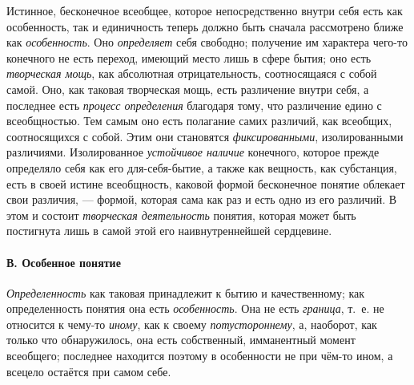 \documentclass[twoside]{article}
\begin{document}
{{Истинное, бесконечное всеобщее, которое непосредственно внутри
себя есть как особенность, так и единичность теперь должно быть сначала
рассмотрено ближе как
{\em особенность}. Оно
{\em определяет} себя
свободно; получение им характера чего-то конечного не есть переход, имеющий
место лишь в сфере бытия; оно есть
{\em творческая мощь},
как абсолютная отрицательность, соотносящаяся с собой самой.
Оно, как таковая творческая мощь, есть различение внутри себя, а последнее
есть {\em процесс определения}
благодаря тому, что различение едино с всеобщностью. Тем
самым оно есть полагание самих различий, как всеобщих, соотносящихся с
собой. Этим они становятся
{\em фиксированными},
изолированными различиями. Изолированное
{\em устойчивое наличие}
конечного, которое прежде определяло себя как его
для-себя-бытие, а также как вещность, как субстанция, есть в своей истине
всеобщность, каковой формой бесконечное понятие облекает свои различия, —
формой, которая сама как раз и есть одно из его различий. В
этом и состоит {\em творческая
деятельность} понятия, которая может быть постигнута лишь в
самой этой его наивнутреннейшей сердцевине.

\paragraph[В. Особенное понятие]{В. Особенное понятие}
{\em Определенность} как
таковая принадлежит к бытию и качественному; как определенность понятия она
есть {\em особенность}.
Она не есть
{\em граница}, т.~е. не
относится к чему-то {\em иному},
как к своему
{\em потустороннему}, а,
наоборот, как только что обнаружилось, она есть собственный, имманентный
момент всеобщего; последнее находится поэтому в особенности не 
при чём-то ином, а всецело остаётся при самом себе.

}}
\end{document}
